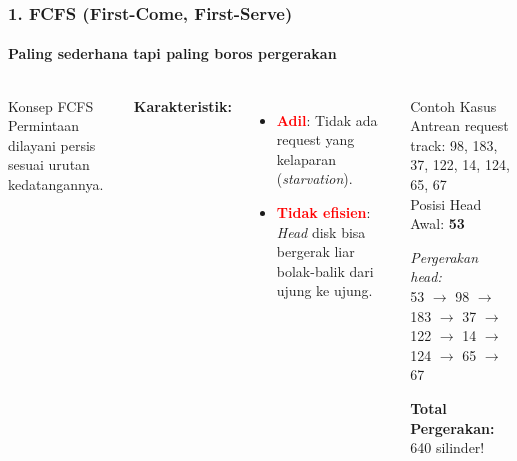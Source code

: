 \documentclass[t,aspectratio=169,xcolor=dvipsnames]{beamer}
\newcommand{\tem}[1]{\textbf{\textcolor{red}{#1}}}
\begin{document}
\begin{frame}
    \frametitle{1. FCFS (First-Come, First-Serve)}
    \framesubtitle{Paling sederhana tapi paling boros pergerakan}
    \small
    \begin{columns}[T]
        \begin{block}{Konsep FCFS}
            Permintaan dilayani persis sesuai urutan kedatangannya.
        \end{block}
        \textbf{Karakteristik:}
        \begin{itemize}
            \item \tem{Adil}: Tidak ada request yang kelaparan (\textit{starvation}).
            \item \tem{Tidak efisien}: \textit{Head} disk bisa bergerak liar bolak-balik dari ujung ke ujung.
        \end{itemize}

        \begin{exampleblock}{Contoh Kasus}
            Antrean request track: 98, 183, 37, 122, 14, 124, 65, 67\\
            Posisi Head Awal: \textbf{53}
            
            \vspace{0.2cm}
            \textit{Pergerakan head:}\\
            53 $\to$ 98 $\to$ 183 $\to$ 37 $\to$ 122 $\to$ 14 $\to$ 124 $\to$ 65 $\to$ 67
            
            \vspace{0.2cm}
            \textbf{Total Pergerakan:} 640 silinder!
        \end{exampleblock}
    \end{columns}
\end{frame}
\end{document}

